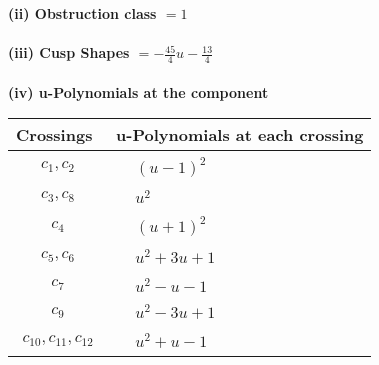 \documentclass[1p]{elsarticle_modified}
\theoremstyle{definition}
\begin{document}
\flushleft \textbf{(ii) Obstruction class $= 1$}\\~\\
\flushleft \textbf{(iii) Cusp Shapes $= -\frac{45}{4} u-\frac{13}{4}$}\\~\\
\newpage\renewcommand{\arraystretch}{1}
\flushleft \textbf{(iv) u-Polynomials at the component}\newline \\
\begin{tabular}{m{50pt}|m{274pt}}
Crossings & \hspace{64pt}u-Polynomials at each crossing \\
\hline $$\begin{aligned}c_{1},c_{2}\end{aligned}$$&$\begin{aligned}
&(u-1)^2
\end{aligned}$\\
\hline $$\begin{aligned}c_{3},c_{8}\end{aligned}$$&$\begin{aligned}
&u^2
\end{aligned}$\\
\hline $$\begin{aligned}c_{4}\end{aligned}$$&$\begin{aligned}
&(u+1)^2
\end{aligned}$\\
\hline $$\begin{aligned}c_{5},c_{6}\end{aligned}$$&$\begin{aligned}
&u^2+3 u+1
\end{aligned}$\\
\hline $$\begin{aligned}c_{7}\end{aligned}$$&$\begin{aligned}
&u^2- u-1
\end{aligned}$\\
\hline $$\begin{aligned}c_{9}\end{aligned}$$&$\begin{aligned}
&u^2-3 u+1
\end{aligned}$\\
\hline $$\begin{aligned}c_{10},c_{11},c_{12}\end{aligned}$$&$\begin{aligned}
&u^2+u-1
\end{aligned}$\\
\hline
\end{tabular}\\~\\
\end{document}
